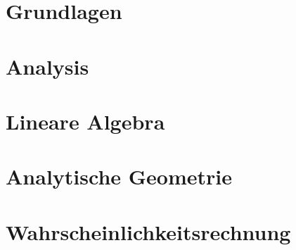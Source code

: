 \part{Grundlagen}




\part{Analysis}








\part{Lineare Algebra}



\part{Analytische Geometrie}






\part{Wahrscheinlichkeitsrechnung}





